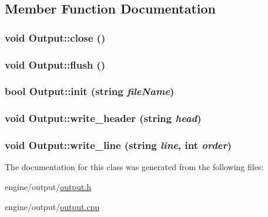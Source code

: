 \subsection{Member Function Documentation}
\hypertarget{classOutput_a8ad983d5d1526a180e3a9cdb005b4198}{
\subsubsection[{close}]{\setlength{\rightskip}{0pt plus 5cm}void Output::close ()}}
\label{classOutput_a8ad983d5d1526a180e3a9cdb005b4198}
\hypertarget{classOutput_a0e201407bdd9555b8618575ce155ca20}{
\subsubsection[{flush}]{\setlength{\rightskip}{0pt plus 5cm}void Output::flush ()}}
\label{classOutput_a0e201407bdd9555b8618575ce155ca20}
\hypertarget{classOutput_a5622f8a5844d8a705d16c91abe4e3fa3}{
\subsubsection[{init}]{\setlength{\rightskip}{0pt plus 5cm}bool Output::init (string {\em fileName})}}
\label{classOutput_a5622f8a5844d8a705d16c91abe4e3fa3}
\hypertarget{classOutput_ac8c48b57590c89dcd7993c8497ddde23}{
\subsubsection[{write\_\-header}]{\setlength{\rightskip}{0pt plus 5cm}void Output::write\_\-header (string {\em head})}}
\label{classOutput_ac8c48b57590c89dcd7993c8497ddde23}
\hypertarget{classOutput_a616ea937fe1d9b04fcd60cbd4797e3c4}{
\subsubsection[{write\_\-line}]{\setlength{\rightskip}{0pt plus 5cm}void Output::write\_\-line (string {\em line}, \/  int {\em order})}}
\label{classOutput_a616ea937fe1d9b04fcd60cbd4797e3c4}


The documentation for this class was generated from the following files:\begin{DoxyCompactItemize}
\item 
engine/output/\hyperlink{output_8h}{output.h}\item 
engine/output/\hyperlink{output_8cpp}{output.cpp}\end{DoxyCompactItemize}
